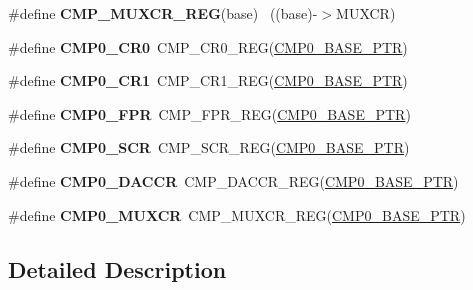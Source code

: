 \begin{DoxyCompactItemize}
\item 
\hypertarget{group___c_m_p___register___accessor___macros_ga61de65bd4b7dc63f96d8c361be243a08}{}\#define {\bfseries C\+M\+P\+\_\+\+M\+U\+X\+C\+R\+\_\+\+R\+E\+G}(base)                                        ~((base)-\/$>$M\+U\+X\+C\+R)\label{group___c_m_p___register___accessor___macros_ga61de65bd4b7dc63f96d8c361be243a08}

\item 
\hypertarget{group___c_m_p___register___accessor___macros_ga0b4ea995265b027fb308b236b2f0afd4}{}\#define {\bfseries C\+M\+P0\+\_\+\+C\+R0}~C\+M\+P\+\_\+\+C\+R0\+\_\+\+R\+E\+G(\hyperlink{group___c_m_p___peripheral_ga5a7a6b1d0743a05435ba5cb2dc2b3431}{C\+M\+P0\+\_\+\+B\+A\+S\+E\+\_\+\+P\+T\+R})\label{group___c_m_p___register___accessor___macros_ga0b4ea995265b027fb308b236b2f0afd4}

\item 
\hypertarget{group___c_m_p___register___accessor___macros_ga993cebfc8cb6bcf6caec49cd75218d17}{}\#define {\bfseries C\+M\+P0\+\_\+\+C\+R1}~C\+M\+P\+\_\+\+C\+R1\+\_\+\+R\+E\+G(\hyperlink{group___c_m_p___peripheral_ga5a7a6b1d0743a05435ba5cb2dc2b3431}{C\+M\+P0\+\_\+\+B\+A\+S\+E\+\_\+\+P\+T\+R})\label{group___c_m_p___register___accessor___macros_ga993cebfc8cb6bcf6caec49cd75218d17}

\item 
\hypertarget{group___c_m_p___register___accessor___macros_gafc67824f9a3bc92eaf359c91bf1df5b6}{}\#define {\bfseries C\+M\+P0\+\_\+\+F\+P\+R}~C\+M\+P\+\_\+\+F\+P\+R\+\_\+\+R\+E\+G(\hyperlink{group___c_m_p___peripheral_ga5a7a6b1d0743a05435ba5cb2dc2b3431}{C\+M\+P0\+\_\+\+B\+A\+S\+E\+\_\+\+P\+T\+R})\label{group___c_m_p___register___accessor___macros_gafc67824f9a3bc92eaf359c91bf1df5b6}

\item 
\hypertarget{group___c_m_p___register___accessor___macros_ga4b5f2afaed69d7a475c7b49e6072c2d1}{}\#define {\bfseries C\+M\+P0\+\_\+\+S\+C\+R}~C\+M\+P\+\_\+\+S\+C\+R\+\_\+\+R\+E\+G(\hyperlink{group___c_m_p___peripheral_ga5a7a6b1d0743a05435ba5cb2dc2b3431}{C\+M\+P0\+\_\+\+B\+A\+S\+E\+\_\+\+P\+T\+R})\label{group___c_m_p___register___accessor___macros_ga4b5f2afaed69d7a475c7b49e6072c2d1}

\item 
\hypertarget{group___c_m_p___register___accessor___macros_ga35e0e1f16fe611949cc7970ad0119891}{}\#define {\bfseries C\+M\+P0\+\_\+\+D\+A\+C\+C\+R}~C\+M\+P\+\_\+\+D\+A\+C\+C\+R\+\_\+\+R\+E\+G(\hyperlink{group___c_m_p___peripheral_ga5a7a6b1d0743a05435ba5cb2dc2b3431}{C\+M\+P0\+\_\+\+B\+A\+S\+E\+\_\+\+P\+T\+R})\label{group___c_m_p___register___accessor___macros_ga35e0e1f16fe611949cc7970ad0119891}

\item 
\hypertarget{group___c_m_p___register___accessor___macros_ga5ee1e22a7f08ec3cdad0083a790b10b3}{}\#define {\bfseries C\+M\+P0\+\_\+\+M\+U\+X\+C\+R}~C\+M\+P\+\_\+\+M\+U\+X\+C\+R\+\_\+\+R\+E\+G(\hyperlink{group___c_m_p___peripheral_ga5a7a6b1d0743a05435ba5cb2dc2b3431}{C\+M\+P0\+\_\+\+B\+A\+S\+E\+\_\+\+P\+T\+R})\label{group___c_m_p___register___accessor___macros_ga5ee1e22a7f08ec3cdad0083a790b10b3}

\end{DoxyCompactItemize}


\subsection{Detailed Description}
